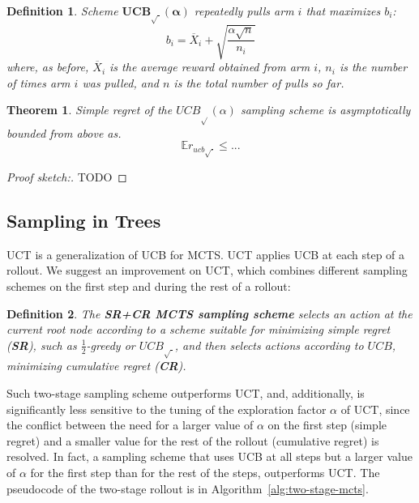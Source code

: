 \documentclass[letterpaper]{article}
\newcommand {\IE} {\ensuremath {\mathbb{E}}}
\newtheorem{dfn}{Definition}
\newtheorem{thm}{Theorem}
\begin{document}
\begin{dfn} Scheme $\mathbf{UCB_{\sqrt{\cdot}}(\alpha)}$ repeatedly pulls arm $i$ that
maximizes $b_i$:
\begin{equation}
b_i=\overline X_i+\sqrt {\frac {\alpha \sqrt n} {n_i}}
\end{equation}
where, as before, $\overline X_i$ is the average reward obtained from arm $i$,
$n_i$ is the number of times arm $i$ was pulled, and $n$ is the total
number of pulls so far. \end{dfn}

\begin{thm} Simple regret of the $UCB_{\sqrt{}}(\alpha)$ sampling
  scheme is asymptotically bounded from above as.
\begin{equation}
\IE r_{ucb\sqrt{\cdot}} \le ...
\end{equation}
\end{thm}
\begin{proof}[Proof sketch:] TODO
\end{proof}

\subsection{Sampling in Trees}
\label{sec:sampling-in-trees}

UCT \cite{Kocsis.uct} is a generalization of UCB for MCTS.  UCT
applies UCB at each step of a rollout.  We suggest an improvement on
UCT, which combines different sampling schemes on the first step and
during the rest of a rollout:
\begin{dfn}
The \textbf{SR+CR MCTS sampling scheme} selects an action at the
current root node according to a scheme suitable for minimizing 
simple regret (\textbf{SR}), such as $\frac 1 2$-greedy or $UCB_{\sqrt{\cdot}}$, and
then selects actions according to $UCB$, minimizing cumulative regret (\textbf{CR}).
\end{dfn}

Such two-stage sampling scheme outperforms UCT, and, additionally, is
significantly less sensitive to the tuning of the exploration factor
$\alpha$ of UCT, since the conflict between the need for a larger
value of $\alpha$ on the first step (simple regret) and a smaller
value for the rest of the rollout (cumulative regret)
\cite{Bubeck.pure} is resolved. In fact, a sampling scheme that uses
UCB at all steps but a larger value of $\alpha$ for the first step
than for the rest of the steps, outperforms UCT. The pseudocode of the
two-stage rollout is in Algorithm~\ref{alg:two-stage-mcts}.
\end{document}
